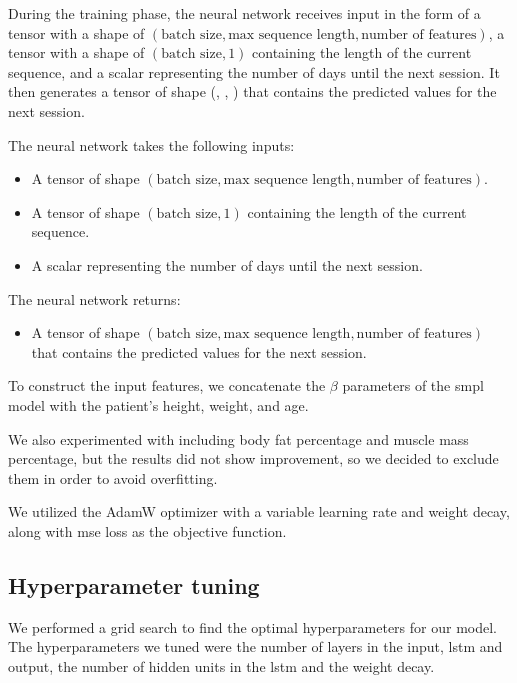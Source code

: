 During the training phase, the neural network receives input in the form of a
tensor with a shape of $(\text{batch size}, \text{max sequence length},
    \text{number of features})$, a tensor with a shape of $(\text{batch size}, 1)$
containing the length of the current sequence, and a scalar representing the
number of days until the next session. It then generates a tensor of shape
(, , ) that
contains the predicted values for the next session.

The neural network takes the following inputs:

\begin{itemize}
    \item A tensor of shape $(\text{batch size}, \text{max sequence length}, \text{number
                  of features})$.
    \item A tensor of shape $(\text{batch size}, 1)$ containing the length of the current
          sequence.
    \item A scalar representing the number of days until the next session.
\end{itemize}

The neural network returns:

\begin{itemize}
    \item A tensor of shape $(\text{batch size}, \text{max sequence length}, \text{number
                  of features})$ that contains the predicted values for the next session.
\end{itemize}

To construct the input features, we concatenate the $\beta$ parameters of the
\gls{smpl} model with the patient's height, weight, and age.

We also experimented with including body fat percentage and muscle mass
percentage, but the results did not show improvement, so we decided to exclude
them in order to avoid overfitting.

We utilized the AdamW optimizer with a variable learning rate and weight decay,
along with \gls{mse} loss as the objective function.

\subsection{Hyperparameter tuning}

We performed a grid search to find the optimal hyperparameters for our model.
The hyperparameters we tuned were the number of layers in the input, \gls{lstm}
and output, the number of hidden units in the \gls{lstm} and the weight decay.

